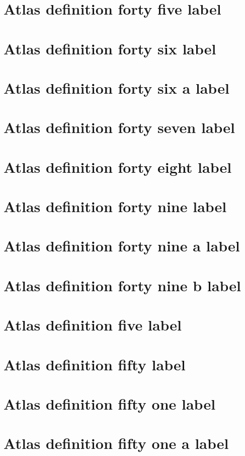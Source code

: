 \documentclass[11pt]{article}
\theoremstyle{definition}
\begin{document}
\section{Atlas definition forty five label}
\label{ll:labels:atlas-d45}
\section{Atlas definition forty six label}
\label{ll:labels:atlas-d46}
\section{Atlas definition forty six a label}
\label{ll:labels:atlas-d46a}
\section{Atlas definition forty seven label}
\label{ll:labels:atlas-d47}
\section{Atlas definition forty eight label}
\label{ll:labels:atlas-d48}
\section{Atlas definition forty nine label}
\label{ll:labels:atlas-d49}
\section{Atlas definition forty nine a label}
\label{ll:labels:atlas-d49a}
\section{Atlas definition forty nine b label}
\label{ll:labels:atlas-d49b}
\section{Atlas definition five label}
\label{ll:labels:atlas-d5}
\section{Atlas definition fifty label}
\label{ll:labels:atlas-d50}
\section{Atlas definition fifty one label}
\label{ll:labels:atlas-d51}
\section{Atlas definition fifty one a label}
\label{ll:labels:atlas-d51a}
\end{document}
